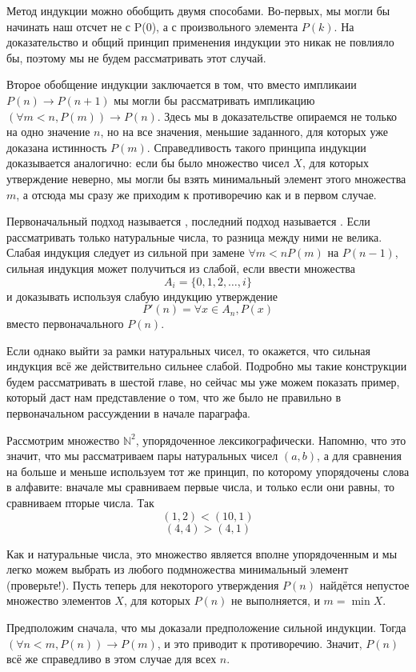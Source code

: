 Метод индукции можно обобщить двумя способами. Во-первых, мы могли бы начинать наш отсчет не с P(0), а с произвольного элемента $P(k)$. На доказательство и общий принцип применения индукции это никак не повлияло бы, поэтому мы не будем рассматривать этот случай.

Второе обобщение индукции заключается в том, что вместо импликаии $P(n)\to P(n+1)$ мы могли бы рассматривать импликацию $(\forall m<n, P(m))\to P(n)$. Здесь мы в доказательстве опираемся не только на одно значение $n$, но на все значения, меньшие заданного, для которых уже доказана истинность $P(m)$. Справедливость такого принципа индукции доказывается аналогично: если бы было множество чисел $X$, для которых утверждение неверно, мы могли бы взять минимальный элемент этого множества $m$, а отсюда мы сразу же приходим к противоречию как и в первом случае.

Первоначальный подход называется , последний подход называется . Если рассматривать только натуральные числа, то разница между ними не велика. Слабая индукция следует из сильной при замене $\forall m<n P(m)$ на $P(n-1)$, сильная индукция может получиться из слабой, если ввести множества
$$A_i = \{0, 1, 2, \ldots, i\}$$
и доказывать используя слабую индукцию утверждение
$$P'(n) = \forall x \in A_n, P(x)$$
вместо первоначального $P(n)$.

Если однако выйти за рамки натуральных чисел, то окажется, что сильная индукция всё же действительно сильнее слабой. Подробно мы такие конструкции будем рассматривать в шестой главе, но сейчас мы уже можем показать пример, который даст нам представление о том, что же было не правильно в первоначальном рассуждении в начале параграфа.

Рассмотрим множество $\mathbb{N}^2$, упорядоченное лексикографически. Напомню, что это значит, что мы рассматриваем пары натуральных чисел $(a, b)$, а для сравнения на больше и меньше используем тот же принцип, по которому упорядочены слова в алфавите: вначале мы сравниваем первые числа, и только если они равны, то сравниваем пторые числа. Так
$$(1, 2) < (10, 1)$$
$$(4, 4) > (4, 1)$$

Как и натуральные числа, это множество является вполне упорядоченным и мы легко можем выбрать из любого подмножества минимальный элемент (проверьте!). Пусть теперь для некоторого утверждения $P(n)$ найдётся непустое множество элементов $X$, для которых $P(n)$ не выполняется, и $m=\min X$.

Предположим сначала, что мы доказали предположение сильной индукции. Тогда $(\forall n < m, P(n))\to P(m)$, и это приводит к противоречию. Значит, $P(n)$ всё же справедливо в этом случае для всех $n$.

